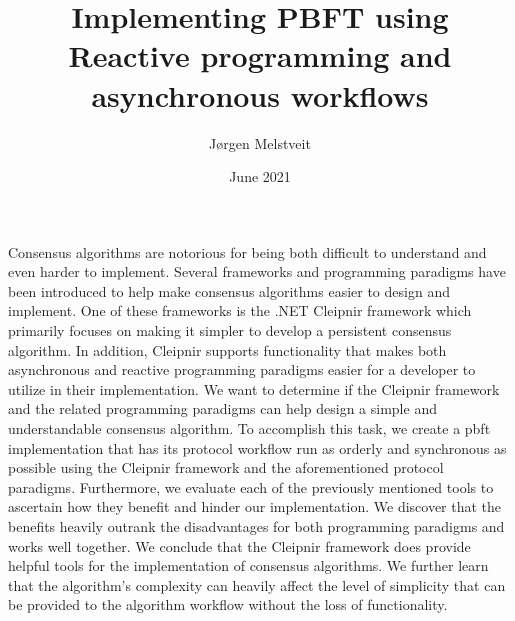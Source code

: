 \documentclass[12pt, a4paper]{report}
\numberwithin{figure}{section}
\numberwithin{table}{section}
\begin{document}
	\setlength{\parskip}{0.5cm}   %
	
	\pagestyle{fancyplain}
	\renewcommand{\chaptermark}[1]{\markboth{#1}{#1}}
	\renewcommand{\sectionmark}[1]{\markright{\thesection\ #1}}
	\lhead[\fancyplain{}{\bfseries\thepage}]{\fancyplain{}{\bfseries\rightmark}}
	\rhead{}
	\chead{}
	\cfoot{\bfseries\thepage}
	\lfoot{}
	\rfoot{}	
	
	\hspace*{-7mm}
	\vspace*{-15mm}
	\thispagestyle{empty}
	\newpage

	
	
	\title{Implementing PBFT using Reactive programming and asynchronous workflows}
	\author{Jørgen Melstveit}
	\date{June 2021}
	\maketitle
	\tableofcontents
	\newpage

	\abstract
	{
Consensus algorithms are notorious for being both difficult to understand and even harder to implement. Several frameworks and programming paradigms have been introduced to help make consensus algorithms easier to design and implement. One of these frameworks is the .NET Cleipnir framework which primarily focuses on making it simpler to develop a persistent consensus algorithm. In addition, Cleipnir supports functionality that makes both asynchronous and reactive programming paradigms easier for a developer to utilize in their implementation. We want to determine if the Cleipnir framework and the related programming paradigms can help design a simple and understandable consensus algorithm. To accomplish this task, we create a \acl{pbft} implementation that has its protocol workflow run as orderly and synchronous as possible using the Cleipnir framework and the aforementioned protocol paradigms.
Furthermore, we evaluate each of the previously mentioned tools to ascertain how they benefit and hinder our implementation. We discover that the benefits heavily outrank the disadvantages for both programming paradigms and works well together. We conclude that the Cleipnir framework does provide helpful tools for the implementation of consensus algorithms.  We further learn that the algorithm’s complexity can heavily affect the level of simplicity that can be provided to the algorithm workflow without the loss of functionality. 
	}
	\newpage
\end{document}
